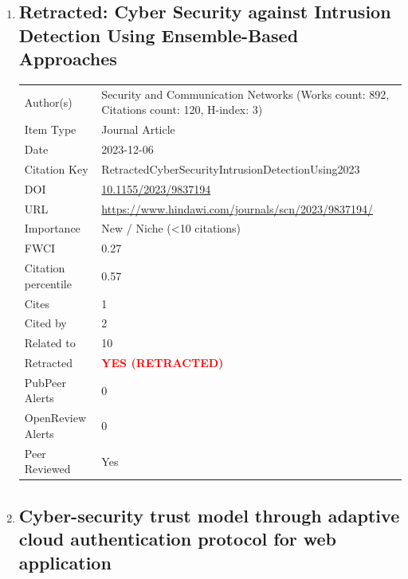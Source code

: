 \documentclass{article}
\begin{document}
\begin{enumerate}[label=\arabic*., font=\Large]
\item
{}\label{retracted-cyber-security-against-intrusion-detection-using-ensemble-based-approaches}
\hypertarget{item_RetractedCyberSecurityIntrusionDetectionUsing2023}{}
\subsection*{Retracted: Cyber Security against Intrusion Detection Using Ensemble-Based Approaches}

\begin{longtable}{p{} p{\contentcolwidth-2\tabcolsep}}
\toprule
Author(s) & Security and Communication Networks (Works count: 892, Citations count: 120, H-index: 3) \\
Item Type & Journal Article \\
Date & 2023-12-06 \\
Citation Key & RetractedCyberSecurityIntrusionDetectionUsing2023 \\
DOI & \href{http://doi.org/10.1155/2023/9837194}{10.1155/2023/9837194} \\
URL & \url{https://www.hindawi.com/journals/scn/2023/9837194/} \\
Importance & New / Niche (<10 citations) \\
FWCI & 0.27 \\
Citation percentile & 0.57 \\
Cites & 1 \\
Cited by & 2 \\
Related to & 10 \\
Retracted & \textbf{\textcolor{red}{YES (RETRACTED)}} \\
PubPeer Alerts & 0 \\
OpenReview Alerts & 0 \\
Peer Reviewed & Yes \\
\bottomrule
\end{longtable}

\item
{}\label{cyber-security-trust-model-through-adaptive-cloud-authentication-protocol-for-web-application}
\hypertarget{item_ALSUWATCybersecurityTrustModelAdaptiveCloudAuthentication2023}{}
\subsection*{Cyber-security trust model through adaptive cloud authentication protocol for web application}


\end{enumerate}
\end{document}
